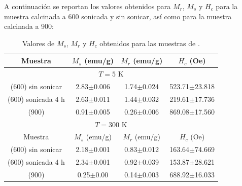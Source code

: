 \documentclass[../main.tex]{subfiles}
\begin{document}
A continuación se reportan los valores obtenidos para $M_r$, $M_s$ y $H_c$ para la muestra calcinada a 600\gradoC{} sonicada y sin sonicar, así como para la muestra calcinada a 900\gradoC{}:

\begin{table}[H]
    \centering
    \begin{tabular}{|c||c|c|c|}
        \hline 
        Muestra & $M_s$ (emu/g) & $M_r$ (emu/g) & $H_c$ (Oe) \\
        \hline
        \hline
        \multicolumn{4}{|c|}{$T=5$ K} \\
        \hline
        \neod{} (600\gradoC{}) sin sonicar & 2.83$\pm$0.006 & 1.74$\pm$0.024 & 523.71$\pm$23.818 \\
        \hline
        \neod{} (600\gradoC{}) sonicada 4 h & 2.63$\pm$0.011 & 1.44$\pm$0.032 & 219.61$\pm$17.736 \\
        \hline
        \neod{} (900\gradoC{}) & 0.91$\pm$0.005 & 0.26$\pm$0.006 & 869.08$\pm$17.560 \\
        \hline
        \multicolumn{4}{|c|}{$T=300$ K} \\
        \hline 
        Muestra & $M_s$ (emu/g) & $M_r$ (emu/g) & $H_c$ (Oe) \\
        \hline
        \hline
        \neod{} (600\gradoC{}) sin sonicar & 2.18$\pm$0.001 & 0.83$\pm$0.012 & 163.64$\pm$74.669 \\
        \hline
        \neod{} (600\gradoC{}) sonicada 4 h & 2.34$\pm$0.001 & 0.92$\pm$0.039 & 153.87$\pm$28.621 \\
        \hline
        \neod{} (900\gradoC{}) & 0.25$\pm$0.00 & 0.14$\pm$0.003 & 688.92$\pm$16.033 \\
        \hline
        \end{tabular} 
    \caption{Valores de $M_s$, $M_r$ y $H_c$ obtenidos para las muestras de \neod{}.}
    \label{tabla:resmvshneod}
\end{table}
\end{document}

